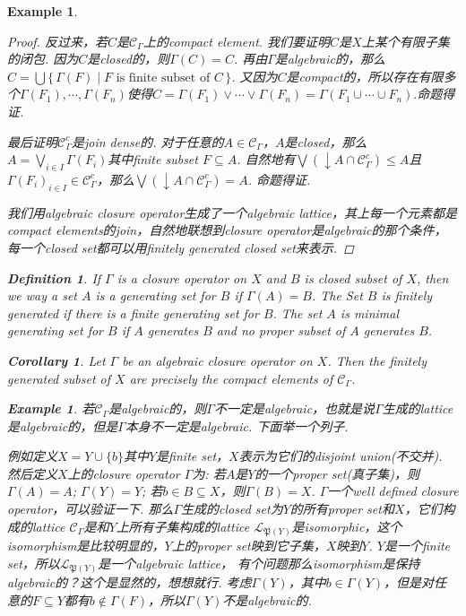 \documentclass{article}
\newtheorem{corollary}[theorem]{Corollary}
\newtheorem{example}[theorem]{Example}
\newtheorem{definition}[theorem]{Definition}
\newcommand\Set[2]{\{\,#1\mid#2\,\}} %
\newcommand\SET[2]{\Set{#1}{\text{#2}}} %
\newcommand\lattice{\mathcal{L}}
\begin{document}
\begin{example}
\begin{proof}
反过来，若$C$是$\mathcal{C}_{\Gamma}$上的compact element. {\color{red}我们要证明$C$是$X$上某个有限子集的闭包}. 因为$C$是closed的，则$\Gamma(C) = C$. 再由$\Gamma$是algebraic的，那么$C = \bigcup\SET{\Gamma(F)}{$F$ is finite subset of $C$}$. 又因为$C$是compact的，所以存在有限多个$\Gamma(F_1),\cdots,\Gamma(F_n)$使得$C = \Gamma(F_1) \vee \cdots \vee \Gamma(F_n) = \Gamma(F_1 \cup \cdots \cup F_n).$命题得证.

{\color{red} 最后证明$\mathcal{C}_{\Gamma}^c$是join dense的}. 对于任意的$A \in \mathcal{C}_{\Gamma}$，$A$是closed，那么$A = \bigvee\limits_{i \in I} \Gamma(F_i)$其中finite subset $F \subseteq A$. 自然地有$\bigvee(\downarrow A \cap \mathcal{C}_{\Gamma}^c) \leq A$且$\Gamma(F_i)_{i \in I} \in \mathcal{C}_{\Gamma}^c$，那么$\bigvee(\downarrow A \cap \mathcal{C}_{\Gamma}^c) = A$. 命题得证.

\color{blue} 我们用algebraic closure operator生成了一个algebraic lattice，其上每一个元素都是compact elements的join，自然地联想到closure operator是algebraic的那个条件，每一个closed set都可以用finitely generated closed set来表示.
\end{proof}


\begin{definition}
\rm If $\Gamma$ is a closure operator on $X$ and $B$ is closed subset of $X$, then we way a set $A$ is a {\color{red} generating set} for $B$ if $\Gamma(A) = B$. The Set $B$ is {\color{red} finitely generated} if there is a finite generating set for $B$.  The set $A$ is {\color{red} minimal generating set} for $B$ if $A$ generates $B$ and no proper subset of $A$ generates $B$.
\end{definition}

\begin{corollary}
\rm Let $\Gamma$ be an algebraic closure operator on $X$. Then the finitely generated subset of $X$  are precisely the compact elements of $\mathcal{C}_{\Gamma}$.
\end{corollary}

\begin{example}
\rm 若$\mathcal{C}_{\Gamma}$是algebraic的，则$\Gamma$不一定是algebraic，也就是说$\Gamma$生成的lattice 是algebraic的，但是$\Gamma$本身不一定是algebraic. 下面举一个列子.

例如定义$X = Y \cup \{b\}$其中$Y$是finite set，$X$表示为它们的disjoint union(不交并). 然后定义$X$上的closure operator $\Gamma$为: 若$A$是$Y$的一个proper set(真子集)，则$\Gamma(A) = A$; $\Gamma(Y) = Y$; 若$b \in B \subseteq X$，则$\Gamma(B) = X$. $\Gamma$一个well defined closure operator，可以验证一下. 那么$\Gamma$生成的closed set为$Y$的所有proper set和$X$，它们构成的lattice $\mathcal{C}_{\Gamma}$是和$Y$上所有子集构成的lattice $\lattice_{\mathfrak{P}(Y)}$是isomorphic，这个isomorphism是比较明显的，$Y$上的proper set映到它子集，$X$映到$Y$.  $Y$是一个finite set，所以$\lattice_{\mathfrak{P}(Y)}$是一个algebraic lattice，{\color{red} 有个问题那么isomorphism是保持algebraic的？这个是显然的}，想想就行. 考虑$\Gamma(Y)$，其中$b \in \Gamma(Y)$，但是对任意的$F \subseteq Y$都有$b \notin \Gamma(F)$，所以$\Gamma(Y)$不是algebraic的.
\end{example} 


\end{example}
\end{document}
